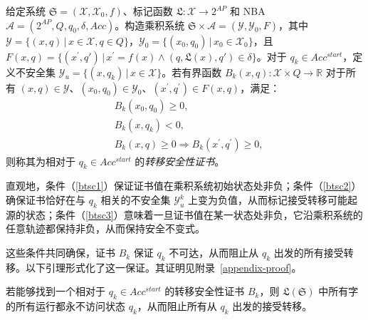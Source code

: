 \begin{definition}[转移安全性证书]
  \label{transition-safety-certificate-definition}
  给定系统 $\mathfrak{S} = (\mathcal{X}, \mathcal{X}_0, f)$、标记函数 $\mathfrak{L}:\mathcal{X} \rightarrow 2^{AP}$ 和 NBA $\mathcal{A} = (2^{AP}, Q, q_0, \delta, Acc)$。构造乘积系统 $\mathfrak{S} \times \mathcal{A} = (\mathcal{Y}, \mathcal{Y}_0, F)$，其中 $\mathcal{Y} = \{(x, q) \,|\, x \in \mathcal{X}, q \in Q \}$，$\mathcal{Y}_0 = \{ (x_0, q_0) \,|\, x_0 \in \mathcal{X}_0 \}$，且 $F(x,q) = \{(x^{\prime}, q') \,|\, x^{\prime} = f(x) \land (q, \mathfrak{L}(x), q') \in \delta\}$。对于 $q_k \in Acc^{start}$，定义不安全集 $\mathcal{Y}_u = \{(x, q_k) \,|\, x \in \mathcal{X}\}$。若有界函数 $B_{k}(x, q): \mathcal{X} \times Q \rightarrow \mathbb{R}$ 对于所有 $(x,q) \in \mathcal{Y}$、$(x_0, q_0) \in \mathcal{Y}_0$、$(x^{\prime}, q^{\prime}) \in F(x, q)$，满足：
  \begin{align}
    &B_{k}(x_0, q_0) \geq 0, \label{btsc1} \\
    &B_{k}(x, q_k) < 0, \label{btsc2} \\
    &B_{k}(x, q) \geq 0 \Rightarrow B_{k}(x^{\prime}, q^{\prime}) \geq 0, \label{btsc3}
  \end{align}
  则称其为相对于 $q_k \in Acc^{start}$ 的\emph{转移安全性证书}。
\end{definition}


直观地，条件（\ref{btsc1}）保证证书值在乘积系统初始状态处非负；条件（\ref{btsc2}）确保证书恰好在与 $q_k$ 相关的不安全集 $\mathcal{Y}_u^k$ 上变为负值，从而标记接受转移可能起源的状态；条件（\ref{btsc3}）意味着一旦证书值在某一状态处非负，它沿乘积系统的任意轨迹都保持非负，从而保持安全不变式。

这些条件共同确保，证书 $B_k$ 保证 $q_k$ 不可达，从而阻止从 $q_k$ 出发的所有接受转移。以下引理形式化了这一保证。其证明见附录~\ref{appendix-proof}。

\begin{lemma}
  \label{transition-safety-lemma}
  若能够找到一个相对于 $q_k \in Acc^{start}$ 的转移安全性证书 $B_k$，则 $\mathfrak{L}(\mathfrak{S})$ 中所有字的所有运行都永不访问状态 $q_k$，从而阻止所有从 $q_k$ 出发的接受转移。
\end{lemma}

